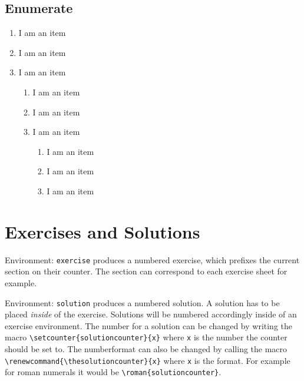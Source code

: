 \documentclass[10pt]{article}
\begin{document}
\subsection{Enumerate}
\begin{enumerate}
  \item I am an item
  \item I am an item
  \item I am an item
        \begin{enumerate}
          \item I am an item
          \item I am an item
          \item I am an item
                \begin{enumerate}
                  \item I am an item
                  \item I am an item
                  \item I am an item
                \end{enumerate}
        \end{enumerate}
\end{enumerate}

\newpage
\section{Exercises and Solutions}
Environment: \verb|exercise| produces a numbered exercise, which prefixes the current section on their counter. The section can correspond to each exercise sheet for example.

\noindent Environment: \verb|solution| produces a numbered solution. A solution has to be placed \emph{inside} of the exercise. Solutions will be numbered accordingly inside of an exercise environment. The number for a solution can be changed by writing the macro \verb|\setcounter{solutioncounter}{x}| where \texttt{x} is the number the counter should be set to.
The numberformat can also be changed by calling the macro \verb|\renewcommand{\thesolutioncounter}{x}| where \verb|x| is the format. For example for roman numerals it would be \verb|\roman{solutioncounter}|.

\begin{exercise}
  \lipsum[1-1]
  \begin{solution}
    \lipsum[1-1]
  \end{solution}
  \begin{solution}
    \lipsum[1-1]
  \end{solution}
  \begin{solution}
    \lipsum[1-1]
  \end{solution}
\end{exercise}
\end{document}
